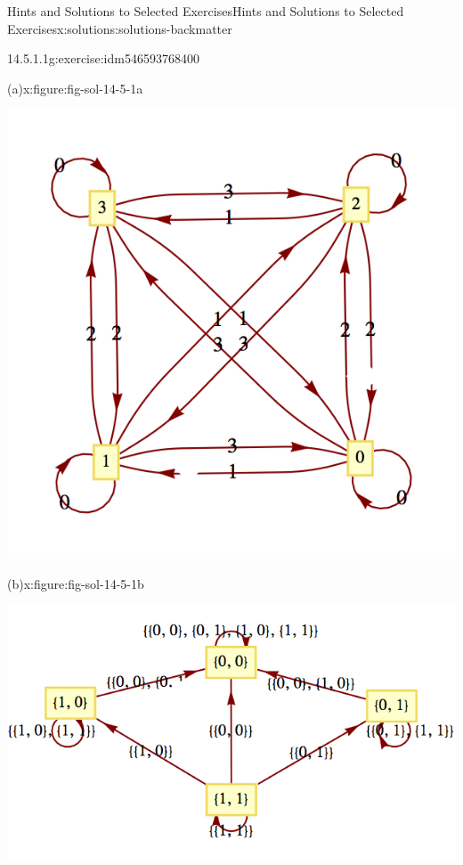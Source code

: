 \documentclass[oneside,10pt,]{book}
\numberwithin{equation}{section}
\begin{document}
\begin{solutions-chapter}{Hints and Solutions to Selected Exercises}{}{Hints and Solutions to Selected Exercises}{}{}{x:solutions:solutions-backmatter}
\begin{divisionsolution}{14.5.1.1}{}{g:exercise:idm546593768400}
\begin{figureptx}{(a)}{x:figure:fig-sol-14-5-1a}{}
\begin{image}{0.15}{0.7}{0.15}%
\includegraphics[width=\linewidth]{images/fig-sol-14-5-1a.png}
\end{image}%
\tcblower
\end{figureptx}%
\begin{figureptx}{(b)}{x:figure:fig-sol-14-5-1b}{}%
\begin{image}{0.15}{0.7}{0.15}%
\includegraphics[width=\linewidth]{images/fig-sol-14-5-1b.png}
\end{image}%
\tcblower
\end{figureptx}%
\end{divisionsolution}%

\end{solutions-chapter}
\end{document}

